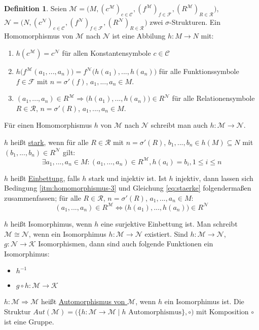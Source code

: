 \documentclass{article}
\theoremstyle{definition}
\newtheorem{dfn}{Definition}[section]
\theoremstyle{plain}
\newcommand{\m}[1]{\mathcal{#1}}
\newcommand{\struc}[3]{\big(#1, (c^{#2})_{c \in \m{C}_{#3}}, (f^{#2})_{f \in \m{F}_{#3}}, (R^{#2})_{R \in \m{R}_{#3}}\big)}
\begin{document}
    \begin{dfn}
        Seien $ \m{M} = \struc{M}{\m{M}}{} $, $ \m{N} = \struc{N}{\m{N}}{} $ zwei $ \sigma $-Strukturen.
        Ein Homomorphismus von $ \m{M} $ nach $ \m{N} $ ist eine Abbilung $ h : M \rightarrow N $ mit:
        \begin{enumerate}
            \item $ h(c^\m{M}) = c^\m{N} $ für allen Konstantensymbole $ c \in \m{C} $
            \item $ h\big(f^\m{M}(a_1, ..., a_n)\big) = f^\m{N}\big(h(a_1), ..., h(a_n)\big) $ für alle Funktionssymbole $ f \in \m{F} $ mit $ n = \sigma'(f) $, $ a_1, ..., a_n \in M $.
            \item \label{itm:homomorphismus-3} $ (a_1, ..., a_n) \in R^\m{M} \Rightarrow \big(h(a_1), ..., h(a_n)) \in R^\m{N} $ für alle Relationensymbole $ R \in \m{R} $, $ n = \sigma'(R) $, $ a_1, ..., a_n \in M $.
        \end{enumerate}

            Für einen Homomorphismus $ h $ von $ \m{M} $ nach $ \m{N} $ schreibt man auch $ h : \m{M} \rightarrow \m{N} $.

            $ h $ heißt \underline{stark}, wenn für alle $ R \in \m{R} $ mit $ n = \sigma'(R) $, $ b_1, ..., b_n \in h(M) \subseteq N $ mit $ (b_1, ..., b_n) \in R^\m{N} $ gilt:
            \begin{equation}
                \label{eq:staerke}
                \exists a_1, ..., a_n \in M : (a_1, ..., a_n) \in R^\m{M}, h(a_i) = b_i, 1 \leq i \leq n
            \end{equation}

            $ h $ heißt \underline{Einbettung}, falls $ h $ stark und injektiv ist.
            Ist $ h $ injektiv, dann lassen sich Bedingung \ref{itm:homomorphismus-3} und Gleichung \eqref{eq:staerke} folgendermaßen zusammenfassen; für alle $ R \in \m{R} $, $ n = \sigma'(R) $, $ a_1, ..., a_n \in M $:
            \begin{equation}
                (a_1, ..., a_n) \in R^\m{M} \Leftrightarrow \big(h(a_1), ..., h(a_n)\big) \in R^\m{N}
            \end{equation}

            $ h $ heißt Isomorphimus, wenn $ h $ eine surjektive Einbettung ist.
            Man schreibt $ \m{M} \cong \m{N} $, wenn ein Isomorphimus $ h : \m{M} \rightarrow \m{N} $ existiert.
            Sind $ h : \m{M} \rightarrow \m{N} $, $ g : \m{N} \rightarrow \m{K} $ Isomorphismen, dann sind auch folgende Funktionen ein Isomorphimus:
            \begin{itemize}
                \item $ h^{-1} $
                \item $ g \circ h : \m{M} \rightarrow \m{K} $
            \end{itemize}

            $ h : \m{M} \Rightarrow \m{M} $ heißt \underline{Automorphismus von $ \m{M} $}, wenn $ h $ ein Isomorphimus ist.
            Die Struktur $ Aut(\m{M}) = \big( \{ h : \m{M} \rightarrow \m{M} \mid h \text{ Automorphismus} \}, \circ \big) $ mit Komposition $ \circ $ ist eine Gruppe.
    \end{dfn}
\end{document}
